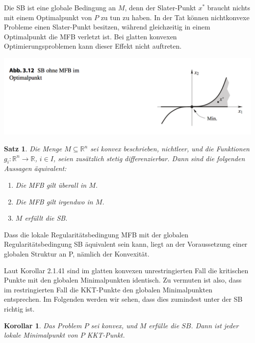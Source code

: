 \documentclass[11pt]{scrreprt}
\newcounter{thm}
\theoremstyle{thmstyle}
\numberwithin{thm}{section}
\newtheorem{korollar}[thm]{Korollar}
\newtheorem{satz}[thm]{Satz}
\begin{document}
Die SB ist eine globale Bedingung an $M$, denn der Slater-Punkt $x^*$ braucht nichts mit einem Optimalpunkt von $P$ zu tun zu haben. In der Tat können nichtkonvexe Probleme einen Slater-Punkt besitzen, während gleichzeitig in einem Optimalpunkt die MFB verletzt ist. Bei glatten konvexen Optimierungsproblemen kann dieser Effekt nicht auftreten.

\begin{center}
	\includegraphics[scale=0.5]{ab312}
\end{center}

\begin{satz}
	Die Menge $M \subseteq \mathbb{R}^n$ sei konvex beschrieben, nichtleer, und die Funktionen $g_i \colon \mathbb{R}^n \rightarrow \mathbb{R}$, $i \in I$, seien zusätzlich stetig differenzierbar. Dann sind die folgenden Aussagen äquivalent:
	\begin{enumerate}[label=\alph*\upshape)]
		\item Die MFB gilt überall in $M$.
		\item Die MFB gilt irgendwo in $M$.
		\item $M$ erfüllt die SB.
	\end{enumerate}
\end{satz}

Dass die lokale Regularitätsbedingung MFB mit der globalen Regularitätsbedingung SB äquivalent sein kann, liegt an der Voraussetzung einer globalen Struktur an P, nämlich der Konvexität. ~\bigskip

Laut Korollar 2.1.41 sind im glatten konvexen unrestringierten Fall die kritischen Punkte mit den globalen Minimalpunkten identisch. Zu vermuten ist also, dass im restringierten Fall die KKT-Punkte den globalen Minimalpunkten entsprechen. Im Folgenden werden wir sehen, dass dies zumindest unter der SB richtig ist.

\begin{korollar}
	Das Problem $P$ sei konvex, und $M$ erfülle die $SB$. Dann ist jeder lokale Minimalpunkt von $P$ KKT-Punkt.
\end{korollar}
\end{document}
